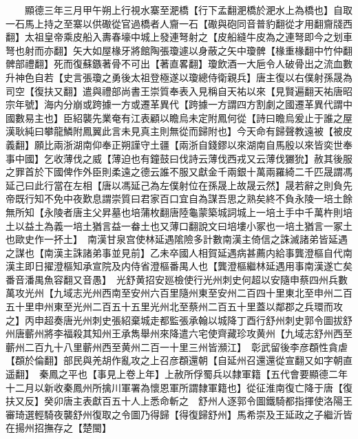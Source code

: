 　　顯德三年三月甲午朔上行視水寨至淝橋【行下孟翻淝橋於淝水上為橋也】自取一石馬上持之至寨以供礮從官過橋者人齎一石【礮與砲同音普豹翻從才用翻齎牋西翻】太祖皇帝乘皮船入夀春壕中城上發連弩射之【皮船縫牛皮為之連弩即今之划車弩也射而亦翻】矢大如屋椽牙將館陶張瓊遽以身蔽之矢中瓊髀【椽重椽翻中竹仲翻髀部禮翻】死而復蘇鏃著骨不可出【著直畧翻】瓊飲酒一大巵令人破骨出之流血數升神色自若【史言張瓊之勇後太祖登極遂以瓊總侍衛親兵】唐主復以右僕射孫晟為司空【復扶又翻】遣與禮部尚書王崇質奉表入見稱自天祐以來【見賢遍翻天祐唐昭宗年號】海内分崩或跨據一方或遷革異代【跨據一方謂四方割劇之國遷革異代謂中國數易主也】臣紹襲先業奄有江表顧以瞻烏未定附鳳何從【詩曰瞻烏爰止于誰之屋漢耿純曰攀龍鱗附鳳翼此言未見真主則無從而歸附也】今天命有歸聲教遠被【被皮義翻】願比兩浙湖南仰奉正朔謹守土疆【兩浙自錢鏐以來湖南自馬殷以來皆奕世奉事中國】乞收薄伐之威【薄迫也有鐘鼓曰伐詩云薄伐西戎又云薄伐玁狁】赦其後服之罪首於下國俾作外臣則柔遠之德云誰不服又獻金千兩銀十萬兩羅綺二千匹晟謂馮延己曰此行當在左相【唐以馮延己為左僕射位在孫晟上故晟云然】晟若辭之則負先帝既行知不免中夜歎息謂崇質曰君家百口宜自為謀吾思之熟矣終不負永陵一培土餘無所知【永陵者唐主父昇墓也培蒲枚翻唐陸龜蒙築城詞城上一培土手中千萬杵則培土以益土為義一培土猶言益一畚土也又薄口翻說文曰培塿小冢也一培土猶言一冢土也歐史作一抔土】　南漢甘泉宫使林延遇隂險多計數南漢主倚信之誅滅諸弟皆延遇之謀也【南漢主誅諸弟事並見前】乙未卒國人相賀延遇病甚薦内給事龔澄樞自代南漢主即日擢澄樞知承宣院及内侍省澄樞番禺人也【龔澄樞繼林延遇用事南漢遂亡矣番音潘禺魚容翻又音愚】　光舒黄招安廵檢使行光州刺史何超以安隨申蔡四州兵數萬攻光州【九域志光州西南至安州六百里隨州東至安州二百四十里東北至申州二百五十里申州東至光州二百五十五里光州北至蔡州二百五十里蓋以鄰郡之兵環而攻之】丙申超奏唐光州刺史張紹棄城走都監張承翰以城降丁酉行舒州刺史郭令圖拔舒州唐蘄州將李福殺其知州王承雋舉州來降遣六宅使齊藏珍攻黄州【九域志舒州西至蘄州二百九十八里蘄州西至黄州二百一十里三州皆瀕江】　彰武留後李彦頵性貪虐【頵於倫翻】部民與羌胡作亂攻之上召彦頵還朝【自延州召還還從宣翻又如字朝直遥翻】　秦鳳之平也【事見上卷上年】上赦所俘蜀兵以隸軍籍【五代會要顯德二年十二月以新收秦鳳州所擒川軍署為懷恩軍所謂隸軍籍也】從征淮南復亡降于唐【復扶又反】癸卯唐主表獻百五十人上悉命斬之　舒州人逐郭令圖鐵騎都指揮使洛陽王審琦選輕騎夜襲舒州復取之令圖乃得歸【得復歸舒州】馬希崇及王延政之子繼沂皆在揚州招撫存之【楚閩】

